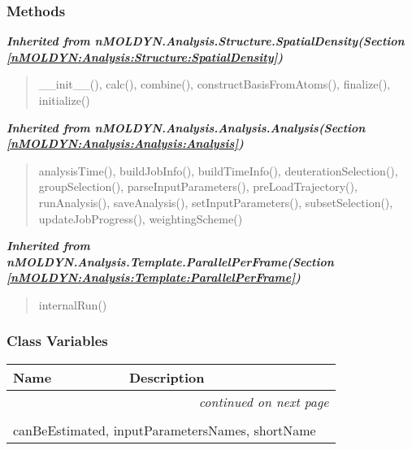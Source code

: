 
  \subsubsection{Methods}


\large{\textbf{\textit{Inherited from nMOLDYN.Analysis.Structure.SpatialDensity\textit{(Section \ref{nMOLDYN:Analysis:Structure:SpatialDensity})}}}}

\begin{quote}
\_\_init\_\_(), calc(), combine(), constructBasisFromAtoms(), finalize(), initialize()
\end{quote}

\large{\textbf{\textit{Inherited from nMOLDYN.Analysis.Analysis.Analysis\textit{(Section \ref{nMOLDYN:Analysis:Analysis:Analysis})}}}}

\begin{quote}
analysisTime(), buildJobInfo(), buildTimeInfo(), deuterationSelection(), groupSelection(), parseInputParameters(), preLoadTrajectory(), runAnalysis(), saveAnalysis(), setInputParameters(), subsetSelection(), updateJobProgress(), weightingScheme()
\end{quote}

\large{\textbf{\textit{Inherited from nMOLDYN.Analysis.Template.ParallelPerFrame\textit{(Section \ref{nMOLDYN:Analysis:Template:ParallelPerFrame})}}}}

\begin{quote}
internalRun()
\end{quote}


  \subsubsection{Class Variables}

    \vspace{-1cm}
\hspace{\varindent}\begin{longtable}{|p{\varnamewidth}|p{\vardescrwidth}|l}
\cline{1-2}
\cline{1-2} \centering \textbf{Name} & \centering \textbf{Description}& \\
\cline{1-2}
\endhead\cline{1-2}\multicolumn{3}{r}{\small\textit{continued on next page}}\\\endfoot\cline{1-2}
\endlastfoot\multicolumn{2}{|l|}{\textit{Inherited from nMOLDYN.Analysis.Structure.SpatialDensity \textit{(Section \ref{nMOLDYN:Analysis:Structure:SpatialDensity})}}}\\
\multicolumn{2}{|p{\varwidth}|}{\raggedright canBeEstimated, inputParametersNames, shortName}\\
\cline{1-2}
\end{longtable}


